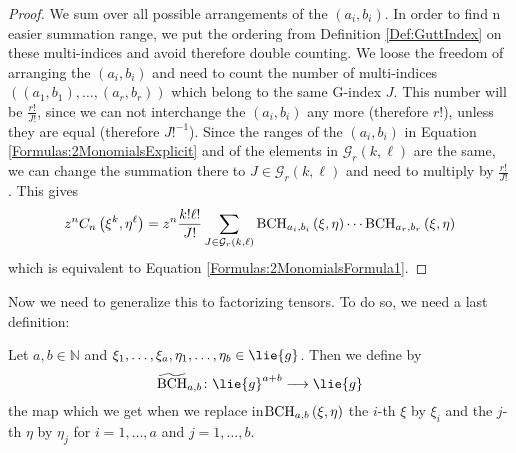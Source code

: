 \begin{proof}
    We sum over all possible arrangements of the $(a_i, b_i)$. In order 
    to find n easier summation range, we put the ordering from Definition 
    \ref{Def:GuttIndex} on these multi-indices and avoid therefore double 
    counting. We loose the freedom of arranging the $(a_i, b_i)$ and 
    need to count the number of multi-indices $((a_1, b_1), \ldots, 
    (a_r, b_r))$ which belong to the same G-index $J$. This number will 
    be $\frac{r!}{J!}$, since we can not interchange the $(a_i, b_i)$ any 
    more (therefore $r!$), unless they are equal (therefore $J!^{-1}$). 
    Since the ranges of the $(a_i, b_i)$ in Equation 
    \eqref{Formulas:2MonomialsExplicit} and of  the elements in 
    $\mathcal{G}_r(k, \ell)$ are the same, we can change the summation there 
    to $J \in \mathcal{G}_r(k, \ell)$ and need to multiply by $\frac{r!}{J!}$. 
    This gives
    \begin{equation*}
    	z^n C_n \left( \xi^k, \eta^{\ell} \right)
    	=
    	z^n \frac{k! \ell!}{J!}
    	\sum\limits_{J \in \mathcal{G}_r(k, \ell)}
    	\mathrm{BCH}_{a_i, b_i}\left(\xi, \eta\right)
        \cdots
        \mathrm{BCH}_{a_r, b_r}\left(\xi, \eta\right)
    \end{equation*}
    which is equivalent to Equation \eqref{Formulas:2MonomialsFormula1}.
\end{proof}
Now we need to generalize this to factorizing tensors. To do so, we 
need a last definition:
\begin{definition}
	\label{Def:BCHTilde}
	Let $a,b \in \mathbb{N}$ and $\xi_1, \ldots, \xi_a, \eta_1, \ldots, 
	\eta_b \in \lie{g}$. Then we define by
	\begin{equation*}
		\widetilde{\mathrm{BCH}}_{a,b}
		\colon
		\lie{g}^{a + b}
		\longrightarrow
		\lie{g}
	\end{equation*}
	the map which we get when we replace in$\mathrm{BCH}_{a, b}\left(\xi, \eta\right)$ 
	the $i$-th $\xi$ by $\xi_i$ and the $j$-th $\eta$ by $\eta_j$
	for $i = 1, \ldots, a$ and $j = 1, \ldots, b$.
\end{definition}
